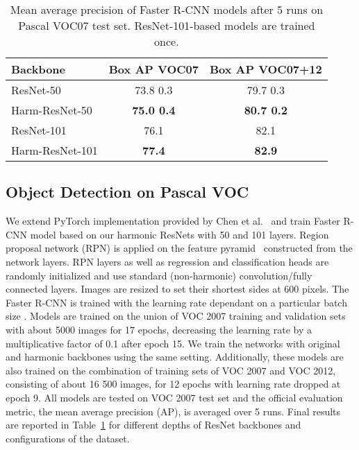 \documentclass[12pt,a4paper]{article}
\begin{document}
\begin{table}[b]
\caption{Mean average precision of Faster R-CNN models after 5 runs on Pascal VOC07 test set. ResNet-101-based models are trained once.} \label{tab:VOC}
\vspace{0.3\baselineskip}
\centering
\begin{tabular}{ l c c }
 \hline
 \textbf{Backbone} &  {\textbf{Box AP VOC07}} &  {\textbf{Box AP VOC07+12}} \\
\hline
ResNet-50 & 73.8  0.3  & 79.7  0.3 \\
Harm-ResNet-50 & \textbf{75.0  0.4} & \textbf{80.7  0.2} \\
\hline
ResNet-101 & 76.1 & 82.1 \\
Harm-ResNet-101 & \textbf{77.4} & \textbf{82.9} \\
 \hline
\end{tabular}
\end{table}

\subsection{Object Detection on Pascal VOC}\label{sec:segmentation:Pascal}

We extend PyTorch implementation provided by Chen et al.~\cite{mmdet} and train Faster R-CNN model based on our harmonic ResNets with 50 and 101 layers. 
Region proposal network (RPN) is applied on the feature pyramid~\cite{Lin17} constructed from the network layers. RPN layers as well as regression and classification heads are randomly initialized and use standard (non-harmonic) convolution/fully connected layers. Images are resized to set their shortest sides at 600 pixels. The Faster R-CNN is trained with the learning rate  dependant on a particular batch size . Models are trained on the union of VOC 2007 training and validation sets with about 5000 images for 17 epochs, decreasing the learning rate by a multiplicative factor of 0.1 after epoch 15. We train the networks with original and harmonic backbones using the same setting. Additionally, these models are also trained on the combination of training sets of VOC 2007 and VOC 2012, consisting of about 16 500 images, for 12 epochs with learning rate dropped at epoch 9. All models are tested on VOC 2007 test set and the official evaluation metric, the mean average precision (AP), is averaged over 5 runs. Final results are reported in Table~\ref{tab:VOC}  for different depths of ResNet backbones and configurations of the dataset.
\end{document}
